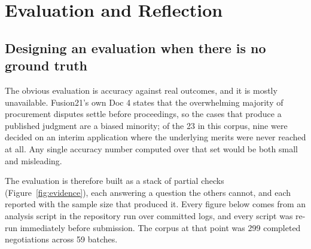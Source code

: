 \chapter{Evaluation and Reflection}
\label{ch:evaluation}

\section{Designing an evaluation when there is no ground truth}
\label{sec:eval-design}

The obvious evaluation is accuracy against real outcomes, and it is mostly
unavailable. Fusion21's own Doc 4 states that the overwhelming majority of
procurement disputes settle before proceedings, so the cases that produce a
published judgment are a biased minority; of the 23 in this corpus, nine were
decided on an interim application where the underlying merits were never reached
at all. Any single accuracy number computed over that set would be both small and
misleading.

The evaluation is therefore built as a stack of partial checks
(Figure~\ref{fig:evidence}), each answering a question the others cannot, and each
reported with the sample size that produced it. Every figure below comes from an
analysis script in the repository run over committed logs, and every script was
re-run immediately before submission. The corpus at that point was 299 completed
negotiations across 59 batches.

